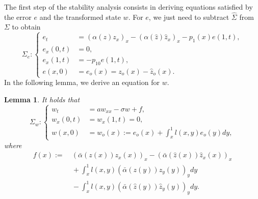 \documentclass[twocolumn]{autart}
\newtheorem{lemm}{Lemma}
\newenvironment{lemma}{\begin{lemm}}{\hfill \end{lemm}}
\begin{document}
The first step of the stability analysis consists in deriving equations satisfied by the error $e$ and the transformed state $w$. For $e$, we just need to subtract $\hat{\Sigma}$ from $\Sigma$ to obtain 
\begin{equation*}
\Sigma_{e} : \left\lbrace 
\begin{aligned}
e_t &= \left(\alpha(z)z_x\right)_x-\left(\alpha(\hat{z})\hat{z}_x\right)_x-p_1(x)e(1,t), \\
e_x(0,t) &= 0, \\
e_x(1,t) &= -p_{10}e(1,t), \\
e(x,0) &= e_o(x) = z_o(x)-\hat{z}_o(x).
\end{aligned}
\right.
\end{equation*}
In the following lemma, we derive an equation for $w$. 
\begin{lemma}
It holds that
\begin{equation*}
\Sigma_{w} : \left\lbrace 
\begin{aligned}
w_t &= a w_{xx} - \sigma w + f, \\
w_x(0,t) &= w_x(1,t) = 0, \\
w(x,0) &= w_o(x) := e_o(x)+\int_x^1l(x,y)e_o(y)dy,
\end{aligned}
\right.
\end{equation*}
where 
\begin{align}
f(x) :=&~ (\bar{\alpha}(z(x))z_x(x))_x-(\bar{\alpha}(\hat{z}(x))\hat{z}_x(x))_x\nonumber \\
&~+\int_x^1l(x,y)(\bar{\alpha}(z(y))z_y(y))_ydy \nonumber\\
&~-\int_x^1l(x,y)(\bar{\alpha}(\hat{z}(y))\hat{z}_y(y))_ydy. \label{f_def}
\end{align}
\hfill  
\end{lemma}
\end{document}
